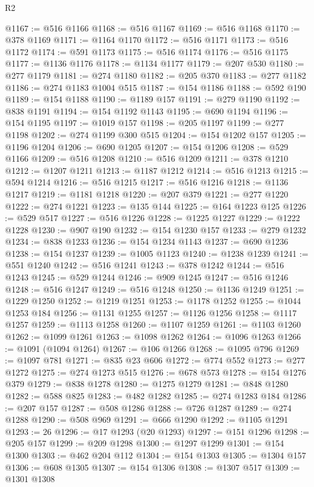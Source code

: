 \begin{lexlean}{R2}
\begin{coremodule}
@1167 := @516 @1166
@1168 := @516 @1167
@1169 := @516 @1168
@1170 := @378 @1169
@1171 := @1164 @1170
@1172 := @516 @1171
@1173 := @516 @1172
@1174 := @591 @1173
@1175 := @516 @1174
@1176 := @516 @1175
@1177 := @1136 @1176
@1178 := @1134 @1177
@1179 := @207 @530
@1180 := @277 @1179
@1181 := @274 @1180
@1182 := @205 @370
@1183 := @277 @1182
@1186 := @274 @1183 @1004 @515
@1187 := @154 @1186
@1188 := @592 @190
@1189 := @154 @1188
@1190 := @1189 @157
@1191 := @279 @1190
@1192 := @838 @1191
@1194 := @154 @1192 @1143
@1195 := @690 @1194
@1196 := @154 @1195
@1197 := @1019 @157
@1198 := @205 @1197
@1199 := @277 @1198
@1202 := @274 @1199 @300 @515
@1204 := @154 @1202 @157
@1205 := @1196 @1204
@1206 := @690 @1205
@1207 := @154 @1206
@1208 := @529 @1166
@1209 := @516 @1208
@1210 := @516 @1209
@1211 := @378 @1210
@1212 := @1207 @1211
@1213 := @1187 @1212
@1214 := @516 @1213
@1215 := @594 @1214
@1216 := @516 @1215
@1217 := @516 @1216
@1218 := @1136 @1217
@1219 := @1181 @1218
@1220 := @207 @379
@1221 := @277 @1220
@1222 := @274 @1221
@1223 := @135 @144
@1225 := @164 @1223 @125
@1226 := @529 @517
@1227 := @516 @1226
@1228 := @1225 @1227
@1229 := @1222 @1228
@1230 := @907 @190
@1232 := @154 @1230 @157
@1233 := @279 @1232
@1234 := @838 @1233
@1236 := @154 @1234 @1143
@1237 := @690 @1236
@1238 := @154 @1237
@1239 := @1005 @1123
@1240 := @1238 @1239
@1241 := @551 @1240
@1242 := @516 @1241
@1243 := @378 @1242
@1244 := @516 @1243
@1245 := @529 @1244
@1246 := @909 @1245
@1247 := @516 @1246
@1248 := @516 @1247
@1249 := @516 @1248
@1250 := @1136 @1249
@1251 := @1229 @1250
@1252 := @1219 @1251
@1253 := @1178 @1252
@1255 := @1044 @1253 @184
@1256 := @1131 @1255
@1257 := @1126 @1256
@1258 := @1117 @1257
@1259 := @1113 @1258
@1260 := @1107 @1259
@1261 := @1103 @1260
@1262 := @1099 @1261
@1263 := @1098 @1262
@1264 := @1096 @1263
@1266 := @1091 (@1094 @1264)
@1267 := @106 @1266
@1268 := @1095 @796
@1269 := @1097 @781
@1271 := @835 @23 @606
@1272 := @774 @552
@1273 := @277 @1272
@1275 := @274 @1273 @515
@1276 := @678 @573
@1278 := @154 @1276 @379
@1279 := @838 @1278
@1280 := @1275 @1279
@1281 := @848 @1280
@1282 := @588 @825
@1283 := @482 @1282
@1285 := @274 @1283 @184
@1286 := @207 @157
@1287 := @508 @1286
@1288 := @726 @1287
@1289 := @274 @1288
@1290 := @508 @969
@1291 := @666 @1290
@1292 := @1105 @1291
@1293 := 26
@1296 := @17 @1293 (@20 @1293)
@1297 := @151 @1296
@1298 := @205 @157
@1299 := @209 @1298
@1300 := @1297 @1299
@1301 := @154 @1300
@1303 := @462 @204 @112
@1304 := @154 @1303
@1305 := @1304 @157
@1306 := @608 @1305
@1307 := @154 @1306
@1308 := @1307 @517
@1309 := @1301 @1308

\end{coremodule}
\end{lexlean}
